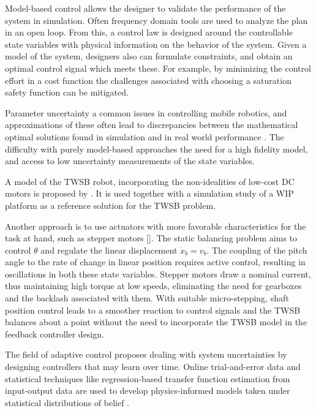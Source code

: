         Model-based control allows the designer to validate the performance of the system in simulation. 
        Often frequency domain tools are used to analyze the plan in an open loop. From this, a control law is designed around 
        the controllable state variables with physical information on the behavior of the system.
        Given a model of the system, designers also can formulate constraints, 
        and obtain an optimal control signal which meets these. For example, by minimizing the control effort in a cost function
        the challenges associated with choosing a saturation safety function can be mitigated.
    
        Parameter uncertainty a common issues in controlling mobile robotics, and approximations of these often lead to 
        discrepancies between the mathematical optimal solutions found in simulation \cite{eide2011lqg} 
        and in real world performance \cite{tran2023fuzzy}. The difficulty with purely model-based approaches 
        the need for a high fidelity model, and access to low uncertainty measurements of the state variables.
    
        A model of the TWSB robot, incorporating the non-idealities of low-cost DC motors is proposed by \cite{yamamoto2008nxtway}.
        It is used together with a simulation study of a WIP platform as a reference solution for the TWSB problem.
    
        Another approach is to use actuators with more favorable characteristics for the task at hand, such as stepper motors []. 
        The static balancing problem aims to control $\theta$ and regulate the linear displacement $\dot x_b=v_b$. The coupling of the 
        pitch angle to the rate of change in linear position requires active control, resulting in oscillations in both these state variables. 
        Stepper motors draw a nominal current, thus maintaining high torque at low speeds, eliminating the need for gearboxes and the 
        backlash associated with them. With suitable micro-stepping, shaft position control 
        leads to a smoother reaction to control signals and the TWSB balances about a point without the need to incorporate the  
        TWSB model in the feedback controller design. 
            
        The field of adaptive control proposes dealing with system uncertainties by designing controllers that may 
        learn over time. Online trial-and-error data and statistical techniques like regression-based transfer
        function estimation from input-output data are used to develop physics-informed models taken under statistical 
        distributions of belief \cite{benosman2018model}.         
                
